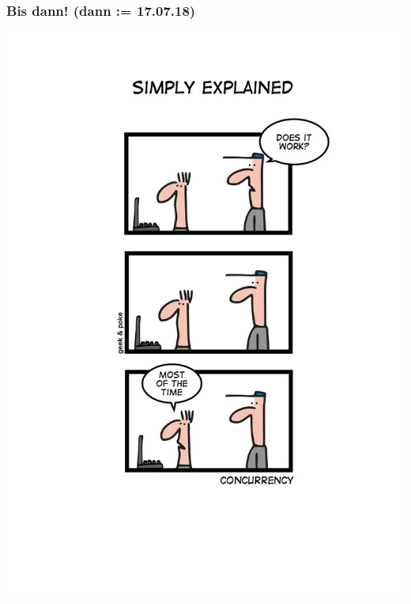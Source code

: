 \documentclass[18pt]{beamer}
\begin{document}
	\begin{frame}
		\frametitle{Bis dann! (dann  := 17.07.18)}
		\centering
		\includegraphics[scale=1.0]{./comics/geek_and_poke_concurrency.jpg}
	\end{frame}
\end{document}
